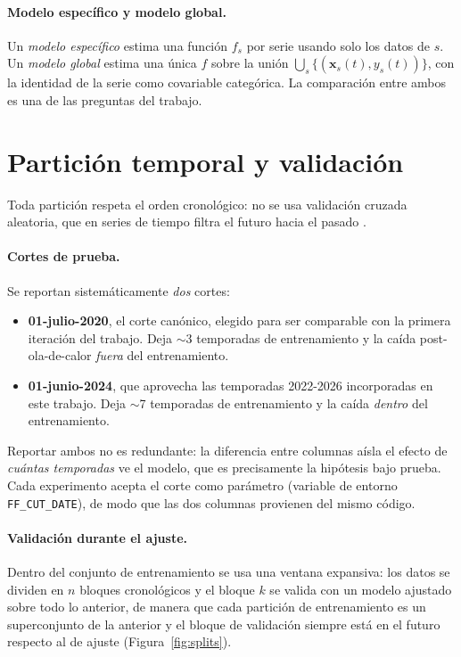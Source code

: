 \paragraph{Modelo específico y modelo global.} Un \emph{modelo específico} estima una función
$f_s$ por serie usando solo los datos de $s$. Un \emph{modelo global} estima una única $f$
sobre la unión $\bigcup_s \{(\mathbf{x}_s(t), y_s(t))\}$, con la identidad de la serie como
covariable categórica. La comparación entre ambos es una de las preguntas del trabajo.

\section{Partición temporal y validación}
\label{sec:met_particion}

Toda partición respeta el orden cronológico: no se usa validación cruzada aleatoria, que en
series de tiempo filtra el futuro hacia el pasado \citep{tashman2000,bergmeir2012}.

\paragraph{Cortes de prueba.} Se reportan sistemáticamente \emph{dos} cortes:
\begin{itemize}
  \item \textbf{01-julio-2020}, el corte canónico, elegido para ser comparable con la primera
  iteración del trabajo. Deja $\sim$3 temporadas de entrenamiento y la caída post-ola-de-calor
  \emph{fuera} del entrenamiento.
  \item \textbf{01-junio-2024}, que aprovecha las temporadas 2022-2026 incorporadas en este
  trabajo. Deja $\sim$7 temporadas de entrenamiento y la caída \emph{dentro} del entrenamiento.
\end{itemize}
Reportar ambos no es redundante: la diferencia entre columnas aísla el efecto de \emph{cuántas
temporadas} ve el modelo, que es precisamente la hipótesis bajo prueba. Cada experimento acepta
el corte como parámetro (variable de entorno \texttt{FF\_CUT\_DATE}), de modo que las dos
columnas provienen del mismo código.

\paragraph{Validación durante el ajuste.} Dentro del conjunto de entrenamiento se usa una
ventana expansiva: los datos se dividen en $n$ bloques cronológicos y el bloque $k$ se valida
con un modelo ajustado sobre todo lo anterior, de manera que cada partición de entrenamiento es
un superconjunto de la anterior y el bloque de validación siempre está en el futuro respecto al
de ajuste (Figura~\ref{fig:splits}).

